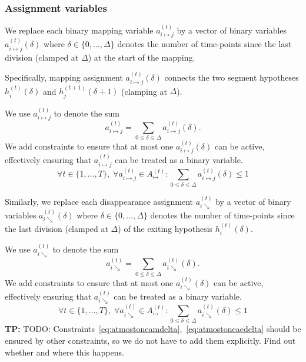 \documentclass[a4paper]{article}
\newcommand{\TP}[1]{{\color{Red}\sc \textbf{TP:} #1}{}}
\newcommand{\set}[1]{\ensuremath{\{#1\}}}
\newcommand{\vhtid}[3][t]{\ensuremath{h^{(#1)}_{#2}\left({#3}\right)}\xspace}
\newcommand{\vamset}[1]{\ensuremath{A^{(#1)}_{\mapsto}}\xspace}
\newcommand{\Amt}[1][t]{\vamset{#1}}
\newcommand{\vam}[3]{\ensuremath{a^{(#1)}_{#2\mapsto#3}}\xspace}
\newcommand{\vamd}[4]{\ensuremath{a^{(#1)}_{#2\mapsto#3}\left(#4\right)}\xspace}
\newcommand{\vae}[2]{\ensuremath{a^{(#1)}_{#2\searrow}}\xspace}
\newcommand{\vaed}[3]{\ensuremath{a^{(#1)}_{#2\searrow}\left(#3\right)}\xspace}
\begin{document}
\subsubsection{Assignment variables}
%
\newcommand{\vamtij}{\vam{t}{i}{j}}
\newcommand{\vamtijd}[1][\delta]{\vamd{t}{i}{j}{#1}}
We replace each binary mapping variable \vamtij by a vector of binary variables \vamtijd where $\delta\in\set{0,\dots,\Delta}$ denotes the number of time-points since the last division (clamped at $\Delta$) at the start of the mapping.

Specifically, mapping assignment \vamtijd connects the two segment hypotheses \vhtid{i}{\delta} and \vhtid[t+1]{j}{\delta+1} (clamping at $\Delta$).

We use \vamtij to denote the sum
\begin{equation}
	\vamtij = \sum_{0 \leq \delta \leq \Delta} \vamtijd.
\end{equation}
We add constraints to ensure that at most one \vamtijd can be active, effectively ensuring that \vamtij can be treated as a binary variable.
\begin{equation}\label{eq:atmostoneamdelta}
  \forall t \in \set{1, \dots, T},\;
  \forall \vamtij \in \Amt:
		\sum_{0 \leq \delta \leq \Delta} \vamtijd
  	\leq 1
\end{equation}
%

\newcommand{\vaeti}{\vae{t}{i}}
\newcommand{\vaetid}[1][\delta]{\vaed{t}{i}{#1}}
\noindent
Similarly, we replace each disappearance assignment \vaeti by a vector of binary variables \vaetid where $\delta\in\set{0,\dots,\Delta}$ denotes the number of time-points since the last division (clamped at $\Delta$) of the exiting hypothesis \vhtid{i}{\delta}.

We use \vaeti to denote the sum
\begin{equation}
	\vaeti = \sum_{0 \leq \delta \leq \Delta} \vaetid.
\end{equation}
We add constraints to ensure that at most one \vaetid can be active, effectively ensuring that \vaeti can be treated as a binary variable.
\begin{equation}\label{eq:atmostoneaedelta}
  \forall t \in \set{1, \dots, T},\;
  \forall \vaeti \in \Amt:
		\sum_{0 \leq \delta \leq \Delta} \vaetid
  	\leq 1
\end{equation}
%
%
\TP{TODO: Constraints~\eqref{eq:atmostoneamdelta},~\eqref{eq:atmostoneaedelta} should be ensured by other constraints, so we do not have to add them explicitly. Find out whether and where this happens.}
%
%
%
\end{document}
